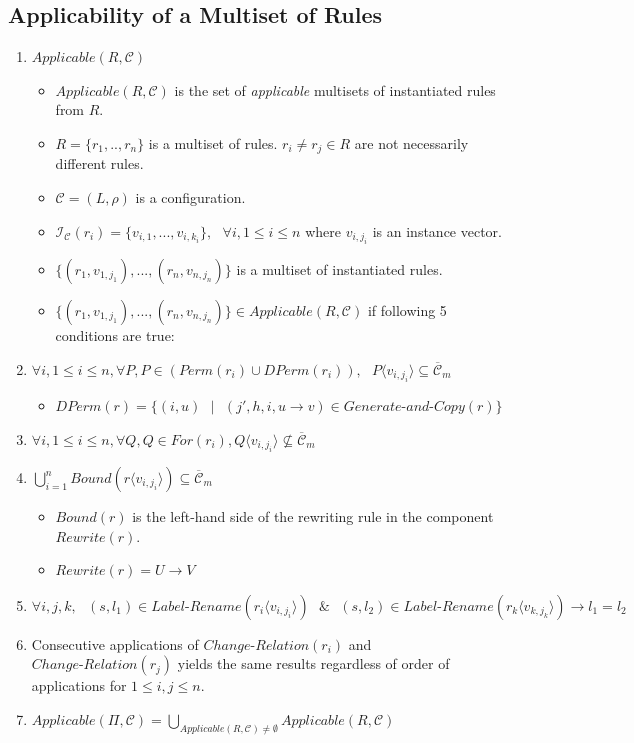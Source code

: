 \documentclass{article}
\newcommand{\mn}{\text{-}}
\newcommand{\s}{\text{ }}
\begin{document}
\begin{appendices}
\subsection{Applicability of a Multiset of Rules}\label{a-ff2-applicable}
\begin{enumerate}
   \item $Applicable(R, \mathcal{C})$ 
         \begin{itemize}
         \item $Applicable(R,\mathcal{C})$ is the set of \textit{applicable} multisets of instantiated rules from $R$.
         \item $R = \{r_1,..,r_n\}$ is a multiset of rules. $r_i \neq r_j \in R$ are not necessarily different rules.
         \item $\mathcal{C} =(L, \rho)$ is a configuration. 
         \item $\mathcal{I}_{\mathcal{C}}(r_i) = \{v_{i,1},...,v_{i,k_i}\},\s \forall i, 1 \leq i \leq n$ where $v_{i,j_i}$ is an instance vector.
         \item $\{(r_1, v_{1,j_1}),...,(r_n,v_{n,j_n})\}$ is a multiset of instantiated rules.
         \item $\{(r_1, v_{1,j_1}),...,(r_n,v_{n,j_n})\}\in Applicable(R,\mathcal{C})$ if following 5 conditions are true:
         \end{itemize}
   \item $\forall i, 1 \leq i \leq n, \forall P, P \in (Perm(r_i) \cup DPerm(r_i)),\s P\langle v_{i,j_i} \rangle \subseteq \overline{\mathcal{C}}_m$
         \begin{itemize}
         \item $DPerm(r) = \{(i,u)\s |\s (j', h, i, u \rightarrow v) \in Generate\mn and\mn Copy(r)\}$
         \end{itemize}
   \item $\forall i, 1 \leq i \leq n, \forall Q, Q \in For(r_i), Q\langle v_{i,j_i} \rangle \not\subseteq \overline{\mathcal{C}}_m$
   \item $\bigcup_{i=1}^{n} Bound(r\langle v_{i,j_i}\rangle) \subseteq \overline{\mathcal{C}}_m$
         \begin{itemize}
         \item $Bound(r)$ is the left-hand side of the rewriting rule in the component $Rewrite(r)$.
         \item $Rewrite(r) = U \rightarrow V$
         \end{itemize}
   \item $\forall i,j,k,\s (s,l_1) \in Label\mn Rename(r_i\langle v_{i,j_i}\rangle)\s \& \s (s, l_2) \in Label\mn Rename(r_k \langle v_{k,j_k} \rangle) \rightarrow l_1 = l_2$ 
   \item Consecutive applications of $Change\mn Relation(r_i)$ and $Change\mn Relation(r_j)$ yields the same results regardless of order of applications for $1 \leq i,j \leq n$.
   \item $Applicable(\Pi, \mathcal{C}) = \bigcup_{Applicable(R, \mathcal{C})\neq \emptyset} Applicable(R,\mathcal{C})$
\end{enumerate}


\end{appendices}
\end{document}

